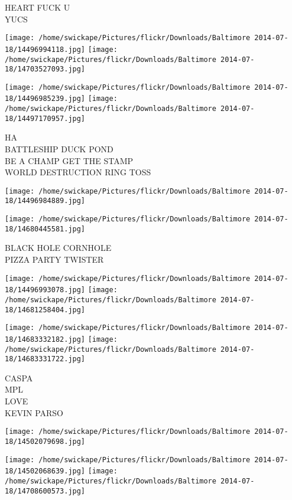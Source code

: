\documentclass[10pt,letterpaper]{article}
\begin{document}
HEART FUCK U\\
YUCS
\pagebreak

\texttt{[image: /home/swickape/Pictures/flickr/Downloads/Baltimore 2014-07-18/14496994118.jpg]}
\texttt{[image: /home/swickape/Pictures/flickr/Downloads/Baltimore 2014-07-18/14703527093.jpg]}

\texttt{[image: /home/swickape/Pictures/flickr/Downloads/Baltimore 2014-07-18/14496985239.jpg]}
\texttt{[image: /home/swickape/Pictures/flickr/Downloads/Baltimore 2014-07-18/14497170957.jpg]}

HA\\
BATTLESHIP DUCK POND\\
BE A CHAMP GET THE STAMP\\
WORLD DESTRUCTION RING TOSS
\pagebreak

\texttt{[image: /home/swickape/Pictures/flickr/Downloads/Baltimore 2014-07-18/14496984889.jpg]}

\vspace{0.25in}
\texttt{[image: /home/swickape/Pictures/flickr/Downloads/Baltimore 2014-07-18/14680445581.jpg]}

BLACK HOLE CORNHOLE\\
PIZZA PARTY TWISTER
\pagebreak

\texttt{[image: /home/swickape/Pictures/flickr/Downloads/Baltimore 2014-07-18/14496993078.jpg]}
\texttt{[image: /home/swickape/Pictures/flickr/Downloads/Baltimore 2014-07-18/14681258404.jpg]}

\texttt{[image: /home/swickape/Pictures/flickr/Downloads/Baltimore 2014-07-18/14683332182.jpg]}
\texttt{[image: /home/swickape/Pictures/flickr/Downloads/Baltimore 2014-07-18/14683331722.jpg]}

CASPA\\
MPL\\
LOVE\\
KEVIN PARSO
\pagebreak

\texttt{[image: /home/swickape/Pictures/flickr/Downloads/Baltimore 2014-07-18/14502079698.jpg]}

\vspace{0.25in}
\texttt{[image: /home/swickape/Pictures/flickr/Downloads/Baltimore 2014-07-18/14502068639.jpg]}
\texttt{[image: /home/swickape/Pictures/flickr/Downloads/Baltimore 2014-07-18/14708600573.jpg]}
\end{document}

